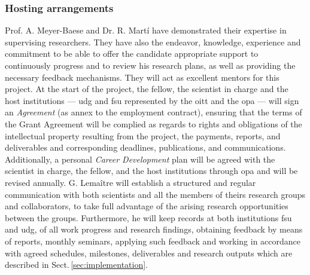 


\subsubsection*{Hosting arrangements}

Prof. A. Meyer-Baese and Dr. R. Mart\'i have demonstrated their expertise in supervising researchers.
They have also the endeavor, knowledge, experience and commitment to be able to offer the candidate appropriate support to continuously progress and to review his research plans, as well as providing the necessary feedback mechanisms.
They will act as excellent mentors for this project.
At the start of the project, the fellow, the scientist in charge and the host institutions --- \ac{udg} and \ac{fsu} represented by the \ac{oitt} and the \ac{opa} --- will sign an \emph{Agreement} (as annex to the employment contract), ensuring that the terms of the Grant Agreement will be complied as regards to rights and obligations of the intellectual property resulting from the project, the payments, reports, and deliverables and corresponding deadlines, publications, and communications.
Additionally, a personal \emph{Career Development} plan will be agreed with the scientist in charge, the fellow, and the host institutions through \ac{opa} and will be revised annually.
G. Lema\^itre will establish a structured and regular communication with both scientists and all the members of theirs research groups and collaborators, to take full advantage of the arising research opportunities between the groups.
Furthermore, he will keep records at both institutions \ac{fsu} and \ac{udg}, of all work progress and research findings, obtaining feedback by means of reports, monthly seminars, applying such feedback and working in accordance with agreed schedules, milestones, deliverables and research outputs which are described in Sect.\,\ref{sec:implementation}.

